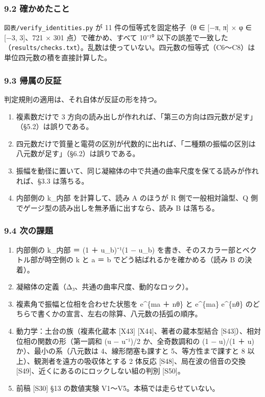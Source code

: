 \documentclass[
  a4paper,
]{ltjsarticle}
\providecommand{\tightlist}{%
  \setlength{\itemsep}{0pt}\setlength{\parskip}{0pt}}
\begin{document}
\subsubsection{9.2
確かめたこと}\label{ux78baux304bux3081ux305fux3053ux3068}

\texttt{図表/\allowbreak{}verify\_\allowbreak{}identities.py} が 11 件の恒等式を固定格子（θ ∈
{[}−π, π{]} × φ ∈ {[}−3, 3{]}、721 × 301 点）で確かめ、すべて 10⁻¹⁰
以下の誤差で一致した（\texttt{results/\allowbreak{}checks.txt}）。乱数は使っていない。四元数の恒等式（C6〜C8）は単位四元数の積を直接計算した。

\subsubsection{9.3 帰属の反証}\label{ux5e30ux5c5eux306eux53cdux8a3c}

判定規則の適用は、それ自体が反証の形を持つ。

\begin{enumerate}
\def\labelenumi{\arabic{enumi}.}
\tightlist
\item
  複素数だけで 3
  方向の読み出しが作れれば、「第三の方向は四元数が足す」（§5.2）は誤りである。
\item
  四元数だけで質量と電荷の区別が代数的に出れば、「二種類の振幅の区別は八元数が足す」（§6.2）は誤りである。
\item
  振幅を動径に置いて、同じ凝縮体の中で共通の曲率尺度を保てる読みが作れれば、§3.3
  は落ちる。
\item
  内部側の k\_内部 を計算して、読み A のほうが R 側で一般相対論型、Q
  側でゲージ型の読み出しを無矛盾に出すなら、読み B は落ちる。
\end{enumerate}

\subsubsection{9.4 次の課題}\label{ux6b21ux306eux8ab2ux984c}

\begin{enumerate}
\def\labelenumi{\arabic{enumi}.}
\tightlist
\item
  内部側の k\_内部 ＝ (1 ＋ u\_b)⁻¹(1 − u\_b)
  を書き、そのスカラー部とベクトル部が時空側の k と \textbar a\textbar{}
  ＝ \textbar b\textbar{} でどう結ばれるかを確かめる（読み B の決着）。
\item
  凝縮体の定義（Δ₃、共通の曲率尺度、動的なロック）。
\item
  複素角で振幅と位相を合わせた状態を e\^{}\{ma ＋ nθ\} と e\^{}\{ma\}
  e\^{}\{nθ\} のどちらで書くかの宣言、左右の除算、八元数の括弧の順序。
\item
  動力学：土台の族（複素化蔵本 {[}X43{]} {[}X44{]}、著者の蔵本型結合
  {[}S43{]}）、相対位相の関数の形（第一調和 (u − u⁻¹)/2 か、全奇数調和の
  (1 − u)/(1 ＋ u) か）、最小の系（八元数は 4、線形閉塞も課すと
  5、等方性まで課すと 8 以上）、観測者を遠方の吸収体とする 2 体反応
  {[}S48{]}、局在波の倍音の交換
  {[}S49{]}、近くにあるのにロックしない組の判別 {[}S50{]}。
\item
  前稿 {[}S30{]} §13 の数値実験 V1〜V5。本稿では走らせていない。
\end{enumerate}
\end{document}
